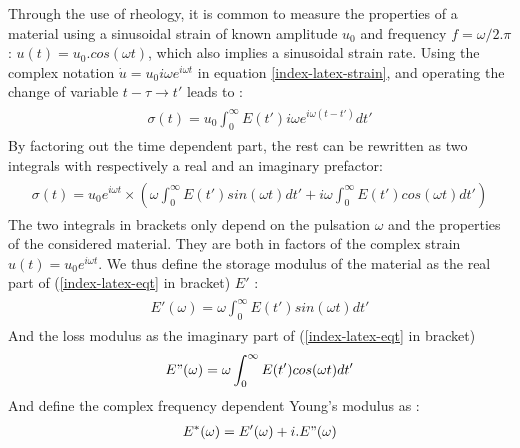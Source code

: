 \documentclass[A4paperpaper,11pt,english]{sphinxmanual}
\begin{document}
Through the use of rheology, it is common to measure the properties of a material using a
sinusoidal strain of known amplitude \(u_0\) and frequency \(f =
\omega/ 2.\pi\) : \(u(t) = u_0.cos(\omega t)\), which also implies a
sinusoidal strain rate. Using the complex notation \(\dot u = u_0 i\omega
e^{i\omega t}\) in equation \eqref{index-latex-strain}, and operating the change of variable \(t-\tau \to t'\)  leads to :
\label{index-latex:equation-eqa13}\begin{gather}
\begin{split}\sigma(t) = u_0\int_0^\infty E(t') i\omega e^{i\omega(t-t')}dt'\end{split}\label{index-latex-eqa13}
\end{gather}
By factoring out the time dependent part, the rest can be rewritten as two integrals with respectively a real and an imaginary prefactor:
\label{index-latex:equation-eqt}\begin{gather}
\begin{split}\sigma(t) = u_0e^{i\omega t}\times\left(
          \omega \int_0^\infty E(t')  sin(\omega t) dt'
          +
        i \omega \int_0^\infty E(t') cos(\omega t) dt'
\right)\end{split}\label{index-latex-eqt}
\end{gather}
The two integrals in brackets only depend on the pulsation \(\omega\) and the properties of the considered material.
They are both in factors of the complex strain \(u(t) = u_0 e^{i\omega t}\).
We thus define the storage modulus of the material as the real part of (\eqref{index-latex-eqt} in bracket) \(E'\) :
\label{index-latex:equation-eqa14}\begin{gather}
\begin{split}E'(\omega) =  \omega \int_0^\infty E(t')  sin(\omega t) dt'\end{split}\label{index-latex-eqa14}
\end{gather}
And the loss modulus as the imaginary part of (\eqref{index-latex-eqt} in bracket)
\label{index-latex:equation-eqa15}\begin{gather}
\begin{split}E"(\omega) =  \omega \int_0^\infty E(t')  cos(\omega t) dt'\end{split}\label{index-latex-eqa15}
\end{gather}
And define the complex frequency dependent Young's modulus as :
\label{index-latex:equation-eqa16}\begin{gather}
\begin{split}E^*(\omega) = E'(\omega) + i.E"(\omega)\end{split}\label{index-latex-eqa16}
\end{gather}
\end{document}
